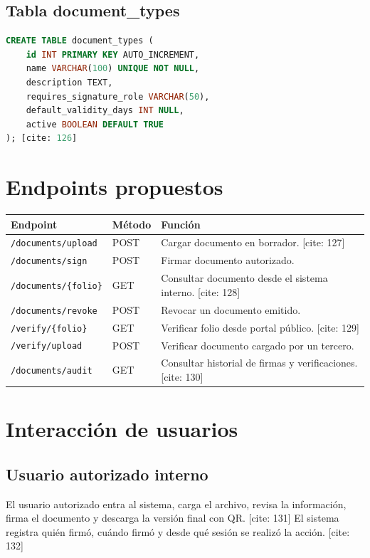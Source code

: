 \documentclass[10pt]{article} [cite: 1]
\begin{document}
\subsection{Tabla document\_types}

\begin{lstlisting}[language=SQL]
CREATE TABLE document_types (
    id INT PRIMARY KEY AUTO_INCREMENT,
    name VARCHAR(100) UNIQUE NOT NULL,
    description TEXT,
    requires_signature_role VARCHAR(50),
    default_validity_days INT NULL,
    active BOOLEAN DEFAULT TRUE
); [cite: 126] 
\end{lstlisting}

\section{Endpoints propuestos}

\begin{longtable}{p{4.5cm}p{3cm}p{6.5cm}}
\toprule
\textbf{Endpoint} & \textbf{Método} & \textbf{Función} \\
\midrule
\texttt{/documents/upload} & POST & Cargar documento en borrador. [cite: 127] \\
\texttt{/documents/sign} & POST & Firmar documento autorizado. \\
\texttt{/documents/\{folio\}} & GET & Consultar documento desde el sistema interno. [cite: 128] \\
\texttt{/documents/revoke} & POST & Revocar un documento emitido. \\
\texttt{/verify/\{folio\}} & GET & Verificar folio desde portal público. [cite: 129] \\
\texttt{/verify/upload} & POST & Verificar documento cargado por un tercero. \\
\texttt{/documents/audit} & GET & Consultar historial de firmas y verificaciones. [cite: 130] \\
\bottomrule
\end{longtable}

\section{Interacción de usuarios}

\subsection{Usuario autorizado interno}

El usuario autorizado entra al sistema, carga el archivo, revisa la información, firma el documento y descarga la versión final con QR. [cite: 131] El sistema registra quién firmó, cuándo firmó y desde qué sesión se realizó la acción. [cite: 132]
\end{document}
